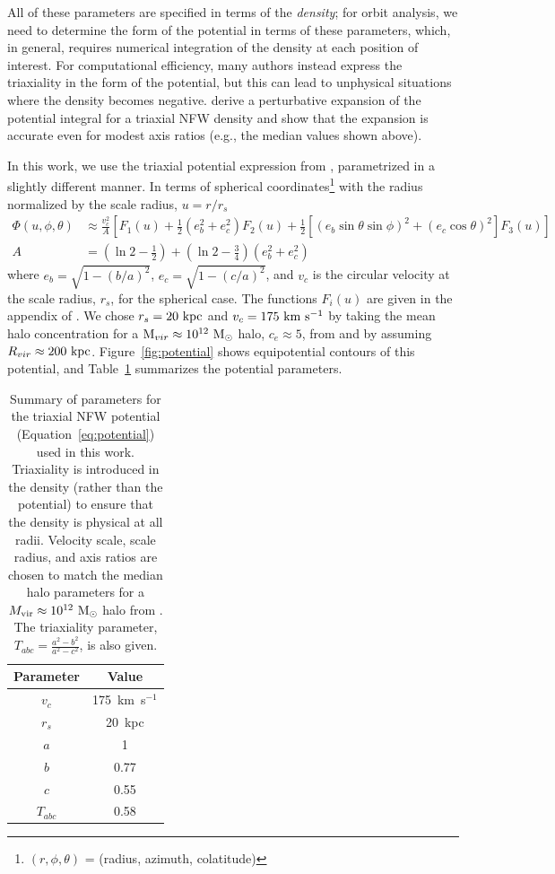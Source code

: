 \documentclass[letterpaper,12pt,preprint]{aastex}
\newcommand{\msun}{\ensuremath{\mathrm{M}_\odot}}
\begin{document}
All of these parameters are specified in terms of the \emph{density}; for orbit analysis, we need to determine the form of the potential in terms of these parameters, which, in general, requires numerical integration of the density at each position of interest. For computational efficiency, many authors instead express the triaxiality in the form of the potential, but this can lead to unphysical situations where the density becomes negative. \citet{leesuto03} derive a perturbative expansion of the potential integral for a triaxial NFW density and show that the expansion is accurate even for modest axis ratios (e.g., the median values shown above). 

In this work, we use the triaxial potential expression from \citet{leesuto03}, parametrized in a slightly different manner. In terms of spherical coordinates\footnote{$(r,\phi,\theta)$ = (radius, azimuth, colatitude)} with the radius normalized by the scale radius, $u = r/r_s$
\begin{align}
	\Phi(u,\phi,\theta) &\approx \frac{v_c^2}{A}\left[F_1(u) + \frac{1}{2}(e_b^2 + e_c^2)F_2(u) + \frac{1}{2} [(e_b\sin\theta \sin\phi)^2 + (e_c\cos\theta)^2] F_3(u) \right]\label{eq:potential}\\
	A &= \left(\ln2 - \frac{1}{2}\right) + \left(\ln2-\frac{3}{4}\right) (e_b^2 + e_c^2)
\end{align}
where $e_b = \sqrt{1 - (b/a)^2}$, $e_c = \sqrt{1 - (c/a)^2}$, and $v_c$ is the circular velocity at the scale radius, $r_s$, for the spherical case. The functions $F_i(u)$ are given in the appendix of \cite{leesuto03}. We chose $r_s=20~{\rm kpc}$ and $v_c = 175~{\rm km}~{\rm s}^{-1}$ by taking the mean halo concentration for a ${\rm M}_{vir} \approx 10^{12}~\msun$ halo, $c_e\approx5$, from \cite{jing02} and by assuming $R_{vir}\approx200~{\rm kpc}$. Figure~\ref{fig:potential} shows equipotential contours of this potential, and Table~\ref{tbl:potential} summarizes the potential parameters.

\begin{table}[ht]
\begin{center}
	\begin{tabular}{ c  c }
	         Parameter & Value\\\toprule
		$v_c$ & 175~km~s$^{-1}$\\
		$r_s$ & 20~kpc\\
		$a$ & 1\\
		$b$ & 0.77\\
		$c$ & 0.55\\
		\midrule
		$T_{abc}$ & 0.58\\
		\bottomrule
		\end{tabular}
	\caption{Summary of parameters for the triaxial NFW potential (Equation~\ref{eq:potential}) used in this work. Triaxiality is introduced in the density (rather than the potential) to ensure that the density is physical at all radii. Velocity scale, scale radius, and axis ratios are chosen to match the median halo parameters for a $M_{\rm vir} \approx 10^{12}~\msun$ halo from \citep{jing02}. The triaxiality parameter, $T_{abc} = \frac{a^2 - b^2}{a^2 - c^2}$, is also given. \label{tbl:potential}}
\end{center}
\end{table}
\end{document}
